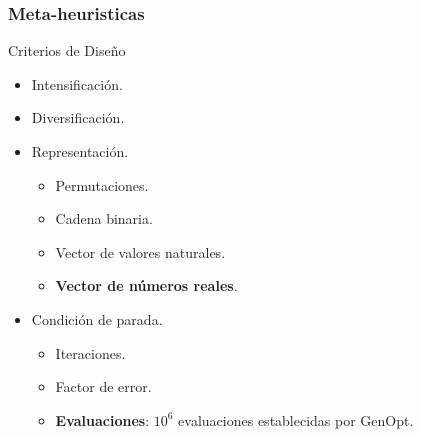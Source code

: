 \begin{frame}
\frametitle{Meta-heuristicas}
\begin{block}{Criterios de Diseño}
\Fontvi
\begin{itemize}
	\item Intensificación.
	\item Diversificación.
	\item Representación.
    \begin{itemize}
    \item Permutaciones.
    \item Cadena binaria.
    \item Vector de valores naturales.
    \item \textbf{Vector de números reales}.
\end{itemize}
	\item Condición de parada.
    \begin{itemize}
    \item Iteraciones.
    \item Factor de error.
    \item \textbf{Evaluaciones}: $10^{6}$ evaluaciones establecidas por GenOpt.
\end{itemize}
	\end{itemize}
    \end{block}
\end{frame}

